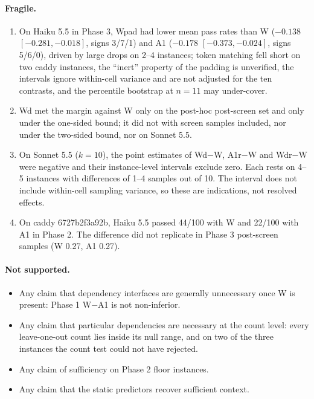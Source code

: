 \documentclass[10pt]{article}
\begin{document}
\paragraph{Fragile.}
\begin{enumerate}
\item On Haiku 5.5 in Phase 3, Wpad had lower mean pass rates than W ($-0.138$ $[-0.281,-0.018]$, signs 3/7/1) and A1 ($-0.178$ $[-0.373,-0.024]$, signs 5/6/0), driven by large drops on 2--4 instances; token matching fell short on two caddy instances, the ``inert'' property of the padding is unverified, the intervals ignore within-cell variance and are not adjusted for the ten contrasts, and the percentile bootstrap at $n=11$ may under-cover.
\item Wd met the margin against W only on the post-hoc post-screen set and only under the one-sided bound; it did not with screen samples included, nor under the two-sided bound, nor on Sonnet 5.5.
\item On Sonnet 5.5 ($k=10$), the point estimates of Wd$-$W, A1r$-$W and Wdr$-$W were negative and their instance-level intervals exclude zero. Each rests on 4--5 instances with differences of 1--4 samples out of 10. The interval does not include within-cell sampling variance, so these are indications, not resolved effects.
\item On caddy 6727b2f3a92b, Haiku 5.5 passed 44/100 with W and 22/100 with A1 in Phase 2. The difference did not replicate in Phase 3 post-screen samples (W 0.27, A1 0.27).
\end{enumerate}

\paragraph{Not supported.}
\begin{itemize}
\item Any claim that dependency interfaces are generally unnecessary once W is present: Phase 1 W$-$A1 is not non-inferior.
\item Any claim that particular dependencies are necessary at the count level: every leave-one-out count lies inside its null range, and on two of the three instances the count test could not have rejected.
\item Any claim of sufficiency on Phase 2 floor instances.
\item Any claim that the static predictors recover sufficient context.
\end{itemize}
\end{document}

